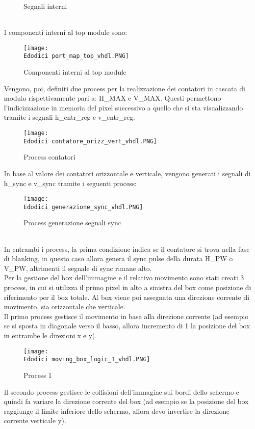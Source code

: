 \documentclass[12pt]{article}
\def \Edodici {Allegati/Esercizio12/}
\begin{document}
{\begin{figure}[ht]
    \caption{Segnali interni}
\end{figure}
\\I componenti interni al top module sono:
\begin{figure}[ht]
    \texttt{[image: \\Edodici port\_map\_top\_vhdl.PNG]}
    \caption{Componenti interni al top module}
\end{figure}
\newpage
Vengono, poi, definiti due process per la realizzazione dei contatori in cascata di modulo rispettivamente pari a: H\_MAX e V\_MAX. Questi permettono l’indicizzazione in memoria del pixel successivo a quello che si sta visualizzando tramite i segnali h\_cntr\_reg e v\_cntr\_reg.
\begin{figure}[ht!]
    \texttt{[image: \\Edodici contatore\_orizz\_vert\_vhdl.PNG]}
    \caption{Process contatori}
\end{figure}
\clearpage
In base al valore dei contatori orizzontale e verticale, vengono generati i segnali di h\_sync e v\_sync tramite i seguenti process:
\begin{figure}[ht]
    \texttt{[image: \\Edodici generazione\_sync\_vhdl.PNG]}
    \caption{Process generazione segnali sync}
\end{figure}
\\In entrambi i process, la prima condizione indica se il contatore si trova nella fase di blanking, in questo caso allora genera il sync pulse della durata H\_PW o V\_PW, altrimenti il segnale di sync rimane alto.
\\Per la gestione del box dell’immagine e il relativo movimento sono stati creati 3 process, in cui si utilizza il primo pixel in alto a sinistra del box come posizione di riferimento per il box totale. Al box viene poi assegnata una direzione corrente di movimento, sia orizzontale che verticale.
\\Il primo process gestisce il  movimento in base alla direzione corrente (ad esempio se si sposta in diagonale verso il basso, allora incremento di 1 la posizione del box in entrambe le direzioni x e y).
\begin{figure}[ht!]
    \texttt{[image: \\Edodici moving\_box\_logic\_1\_vhdl.PNG]}
    \caption{Process 1}
\end{figure}
\newpage
Il secondo process gestisce le collisioni dell’immagine sui bordi dello schermo e quindi fa variare la direzione corrente del box (ad esempio se la posizione del box raggiunge il limite inferiore dello schermo, allora devo invertire la direzione corrente verticale y).
}
\end{document}
